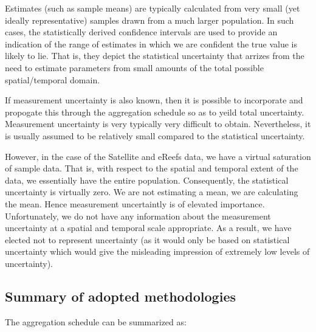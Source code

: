 Estimates (such as sample means) are typically calculated from very small (yet ideally representative) samples
drawn from a much larger population.  In such cases, the statistically derived confidence intervals are used to provide
an indication of the range of estimates in which we are confident the true value is likely to lie.
That is, they depict the statistical uncertainty that arrizes from the need to estimate parameters from
small amounts of the total possible spatial/temporal domain.

If measurement uncertainty is also known, then it is possible to incorporate and propogate this through
the aggregation schedule so as to yeild total uncertainty.  Measurement uncertainty is very typically
very difficult to obtain.  Nevertheless, it is usually assumed to be relatively small compared to
the statistical uncertainty.

However, in the case of the Satellite and eReefs data, we have a virtual saturation of sample data.  That is,
with respect to the spatial and temporal extent of the data, we essentially have the entire population.
Consequently, the statistical uncertainty is virtually zero.  We are not estimating a mean, we
are calculating the mean.  Hence measurement uncertaintly is of elevated importance.  Unfortunately,
we do not have any information about the measurement uncertainty at a spatial and temporal scale
appropriate.  As a result, we have elected not to represent uncertainty (as it would only be based on
statistical uncertainty which would give the misleading impression of extremely low levels of uncertainty).


\subsection{Summary of adopted methodologies}

The aggregation schedule can be summarized as:

\tikzexternaldisable

